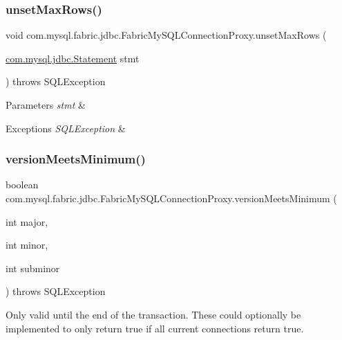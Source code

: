 \subsubsection{\texorpdfstring{unset\+Max\+Rows()}{unsetMaxRows()}}
{\footnotesize\ttfamily void com.\+mysql.\+fabric.\+jdbc.\+Fabric\+My\+S\+Q\+L\+Connection\+Proxy.\+unset\+Max\+Rows (\begin{DoxyParamCaption}\item[{\mbox{\hyperlink{interfacecom_1_1mysql_1_1jdbc_1_1_statement}{com.\+mysql.\+jdbc.\+Statement}}}]{stmt }\end{DoxyParamCaption}) throws S\+Q\+L\+Exception}


\begin{DoxyParams}{Parameters}
{\em stmt} & \\
\hline
\end{DoxyParams}

\begin{DoxyExceptions}{Exceptions}
{\em S\+Q\+L\+Exception} & \\
\hline
\end{DoxyExceptions}
\mbox{\label{classcom_1_1mysql_1_1fabric_1_1jdbc_1_1_fabric_my_s_q_l_connection_proxy_ab2140e74f8ea7de645f157f8416a8d37}} 
\subsubsection{\texorpdfstring{version\+Meets\+Minimum()}{versionMeetsMinimum()}}
{\footnotesize\ttfamily boolean com.\+mysql.\+fabric.\+jdbc.\+Fabric\+My\+S\+Q\+L\+Connection\+Proxy.\+version\+Meets\+Minimum (\begin{DoxyParamCaption}\item[{int}]{major,  }\item[{int}]{minor,  }\item[{int}]{subminor }\end{DoxyParamCaption}) throws S\+Q\+L\+Exception}

Only valid until the end of the transaction. These could optionally be implemented to only return true if all current connections return true. 

